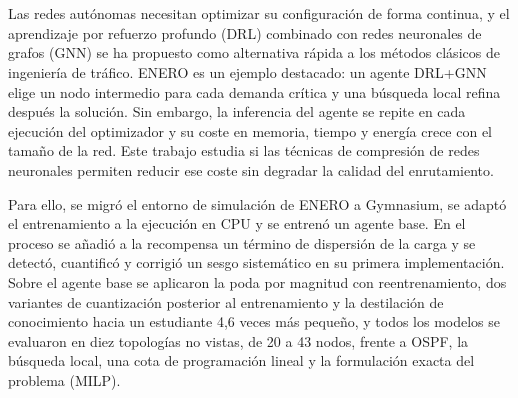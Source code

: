 
\clearpage
\thispagestyle{empty}

\\

\vspace{0.7cm}
\\

Las redes autónomas necesitan optimizar su configuración de forma continua, y el aprendizaje por refuerzo profundo (DRL) combinado con redes neuronales de grafos (GNN) se ha propuesto como alternativa rápida a los métodos clásicos de ingeniería de tráfico. ENERO es un ejemplo destacado: un agente DRL+GNN elige un nodo intermedio para cada demanda crítica y una búsqueda local refina después la solución. Sin embargo, la inferencia del agente se repite en cada ejecución del optimizador y su coste en memoria, tiempo y energía crece con el tamaño de la red. Este trabajo estudia si las técnicas de compresión de redes neuronales permiten reducir ese coste sin degradar la calidad del enrutamiento.

Para ello, se migró el entorno de simulación de ENERO a Gymnasium, se adaptó el entrenamiento a la ejecución en CPU y se entrenó un agente base. En el proceso se añadió a la recompensa un término de dispersión de la carga y se detectó, cuantificó y corrigió un sesgo sistemático en su primera implementación. Sobre el agente base se aplicaron la poda por magnitud con reentrenamiento, dos variantes de cuantización posterior al entrenamiento y la destilación de conocimiento hacia un estudiante 4,6 veces más pequeño, y todos los modelos se evaluaron en diez topologías no vistas, de 20 a 43 nodos, frente a OSPF, la búsqueda local, una cota de programación lineal y la formulación exacta del problema (MILP).

